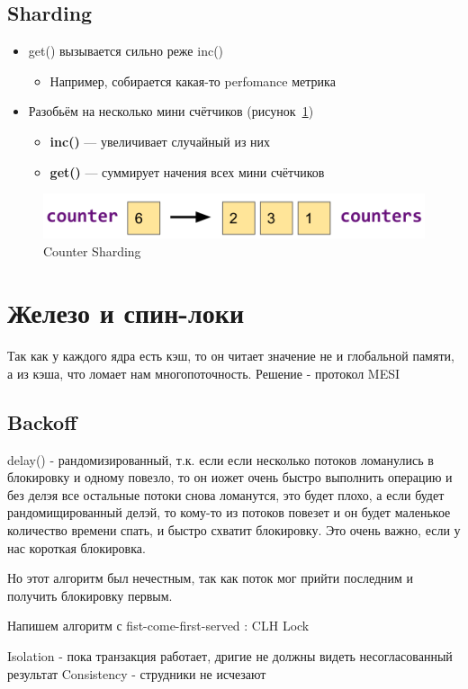 \documentclass[10pt,a4paper,oneside,titlepage]{article}
\theoremstyle{plain}
\theoremstyle{defenition}
\begin{document}
\subsection{Sharding}

\begin{itemize}
	\item get() вызывается сильно реже inc()
	\begin{itemize}
		\item Например, собирается какая-то perfomance метрика
	\end{itemize}
    \item Разобьём на несколько мини счётчиков (рисунок~\ref{fig:countersharding})
    \begin{itemize}
    	\item {\bfseries inc()} --- увеличивает случайный из них
    	\item {\bfseries get()} --- суммирует начения всех мини счётчиков
    \end{itemize}
\end{itemize}

\begin{figure}[h!]
	\centering
	\includegraphics[width=0.4\linewidth]{pictures/CounterSharding}
	\caption{Counter Sharding}
	\label{fig:countersharding}
\end{figure}



\section{Железо и спин-локи}
Так как у каждого ядра есть кэш, то он читает значение не и глобальной памяти, а из кэша, что ломает нам многопоточность. Решение - протокол MESI

\subsection{Backoff}
delay() - рандомизированный, т.к. если если несколько потоков ломанулись в блокировку и одному повезло, то он иожет очень быстро выполнить операцию и без делэя все остальные потоки снова ломанутся, это будет плохо, а если будет рандомищированный делэй, то кому-то из потоков повезет и он будет маленькое количество времени спать, и быстро схватит блокировку. Это очень важно, если у нас короткая блокировка.

Но этот алгоритм был нечестным, так как поток мог прийти последним и получить блокировку первым.

Напишем алгоритм с fist-come-first-served : CLH Lock

Isolation - пока транзакция работает, дригие не должны видеть несогласованный результат
Consistency - струдники не исчезают
\end{document}
